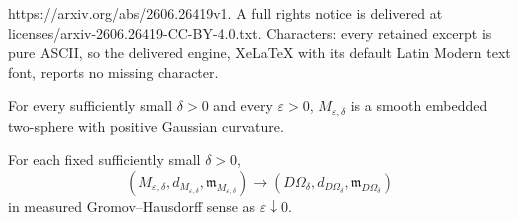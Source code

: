 \documentclass[10pt,a4paper]{amsart}
\newcommand{\Om}{\Omega}
\newcommand{\eps}{\varepsilon}
\newcommand{\mm}{\mathfrak m}
\begin{document}
https://arxiv.org/abs/2606.26419v1. A full rights notice is delivered at licenses/arxiv-2606.26419-CC-BY-4.0.txt. Characters: every retained excerpt is pure ASCII, so the delivered engine, XeLaTeX with its default Latin Modern text font, reports no missing character.
\begin{lemma}\label{lem:positive-curvature}
For every sufficiently small $\delta>0$ and every $\eps>0$,
$M_{\eps,\delta}$ is a smooth embedded two-sphere with positive Gaussian
curvature.
\end{lemma}

\begin{lemma}\label{lem:pancake-convergence-fixed-delta}
For each fixed sufficiently small $\delta>0$,
\begin{equation}\label{eq:pancake-fixed-delta-convergence}
(M_{\eps,\delta},d_{M_{\eps,\delta}},\mm_{M_{\eps,\delta}})
\longrightarrow
(D\Om_\delta,d_{D\Om_\delta},\mm_{D\Om_\delta})
\end{equation}
in measured Gromov--Hausdorff sense as $\eps\downarrow0$.
\end{lemma}
\end{document}
